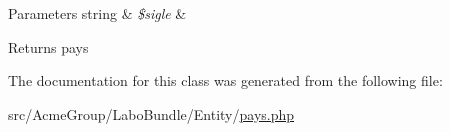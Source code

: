 \begin{DoxyParams}[1]{Parameters}
string & {\em \$sigle} & \\
\hline
\end{DoxyParams}
\begin{DoxyReturn}{Returns}
pays 
\end{DoxyReturn}


The documentation for this class was generated from the following file\+:\begin{DoxyCompactItemize}
\item 
src/\+Acme\+Group/\+Labo\+Bundle/\+Entity/\hyperlink{pays_8php}{pays.\+php}\end{DoxyCompactItemize}
